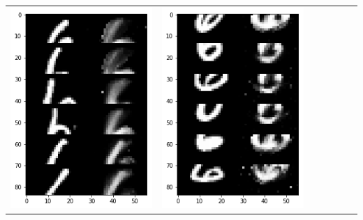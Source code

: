 \documentclass[12pt]{report} %
\begin{document}
\begin{tabular}{m{0.7cm}m{2.4cm}m{2.4cm}m{2.4cm}m{2.4cm}m{2.4cm}m{2.4cm}}
	\includegraphics[scale=0.3]{pictures/M1_6_up.png} & \includegraphics[scale=0.3]{pictures/M1_6_down.png} &

\end{tabular}
\end{document}
